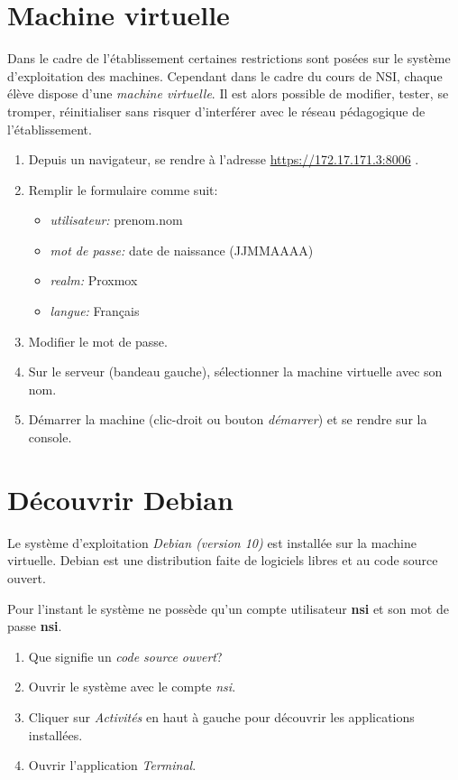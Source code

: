 \documentclass[a4paper,11pt]{article}
\begin{document}
\section{Machine virtuelle}
Dans le cadre de l'établissement certaines restrictions sont posées sur le système d'exploitation des machines. Cependant dans le cadre du cours de NSI, chaque élève dispose d'une \emph{machine virtuelle}. Il est alors possible de modifier, tester, se tromper, réinitialiser sans risquer d'interférer avec le réseau pédagogique de l'établissement.
\begin{activite}
    \begin{enumerate}
        \item Depuis un navigateur, se rendre à l'adresse \url{https://172.17.171.3:8006} .
        \item Remplir le formulaire comme suit:
              \begin{itemize}
                  \item \emph{utilisateur:} prenom.nom
                  \item \emph{mot de passe:} date de naissance (JJMMAAAA)
                  \item \emph{realm:} Proxmox
                  \item \emph{langue:} Français
              \end{itemize}
        \item Modifier le mot de passe.
        \item Sur le serveur (bandeau gauche), sélectionner la machine virtuelle avec son nom.
        \item Démarrer la machine (clic-droit ou bouton \emph{démarrer}) et se rendre sur la console.
    \end{enumerate}
\end{activite}
\section{Découvrir Debian}
Le système d'exploitation \emph{Debian (version 10)} est installée sur la machine virtuelle. Debian est une distribution faite de logiciels libres et au code source ouvert.

Pour l'instant le système ne possède qu'un compte utilisateur \textbf{nsi} et son mot de passe \textbf{nsi}.
\begin{activite}
    \begin{enumerate}
        \item Que signifie un \emph{code source ouvert}?
        \item Ouvrir le système avec le compte \emph{nsi}.
        \item Cliquer sur \emph{Activités} en haut à gauche pour découvrir les applications installées.
        \item Ouvrir l'application \emph{Terminal}.
    \end{enumerate}
\end{activite}
\end{document}
